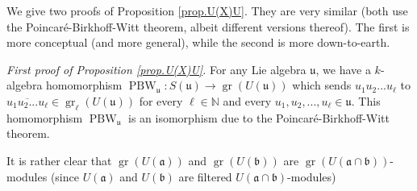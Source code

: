 \documentclass[etingof-lie.tex]{subfiles}
\begin{document}
We give two proofs of Proposition \ref{prop.U(X)U}. They are very similar
(both use the Poincar\'{e}-Birkhoff-Witt theorem, albeit different versions
thereof). The first is more conceptual (and more general), while the second is
more down-to-earth.

\textit{First proof of Proposition \ref{prop.U(X)U}.} For any Lie algebra
$\mathfrak{u}$, we have a $k$-algebra homomorphism $\operatorname*{PBW}%
\nolimits_{\mathfrak{u}}:S\left(  \mathfrak{u}\right)  \rightarrow
\operatorname*{gr}\left(  U\left(  \mathfrak{u}\right)  \right)  $ which sends
$u_{1}u_{2}...u_{\ell}$ to $\overline{u_{1}u_{2}...u_{\ell}}\in
\operatorname*{gr}\nolimits_{\ell}\left(  U\left(  \mathfrak{u}\right)
\right)  $ for every $\ell\in\mathbb{N}$ and every $u_{1},u_{2},...,u_{\ell
}\in\mathfrak{u}$. This homomorphism $\operatorname*{PBW}%
\nolimits_{\mathfrak{u}}$ is an isomorphism due to the
Poincar\'{e}-Birkhoff-Witt theorem.

\begin{verlong}
It is rather clear that $\operatorname*{gr}\left(  U\left(  \mathfrak{a}%
\right)  \right)  $ and $\operatorname*{gr}\left(  U\left(  \mathfrak{b}%
\right)  \right)  $ are $\operatorname*{gr}\left(  U\left(  \mathfrak{a}%
\cap\mathfrak{b}\right)  \right)  $-modules (since $U\left(  \mathfrak{a}%
\right)  $ and $U\left(  \mathfrak{b}\right)  $ are filtered $U\left(
\mathfrak{a}\cap\mathfrak{b}\right)  $-modules)
\end{verlong}
\end{document}
